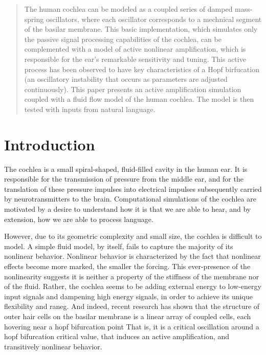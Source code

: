 \documentclass[12pt]{article}
\begin{document}
\maketitle

\begin{abstract}
The human cochlea can be modeled as a coupled series of damped mass-spring oscillators, where each oscillator corresponds to a mechnical segment of the basilar membrane. This basic implementation, which simulates only the passive signal processing capabilities of the cochlea, can be complemented with a model of active nonlinear amplification, which is responsible for the ear's remarkable sensitivity and tuning. This active process has been observed to have key characteristics of a Hopf birfucation (an oscillatory instability that occurs as parameters are adjusted continuously). This paper presents an active amplification simulation coupled with a fluid flow model of the human cochlea. The model is then tested with inputs from natural language. 
\end{abstract}
 

\section{Introduction}
The cochlea is a small spiral-shaped, fluid-filled cavity in the human ear. It is responsible for the transmission of pressure from the middle ear, and for the translation of these pressure impulses into electrical impulses subsequently carried by neurotransmitters to the brain. Computational simulations of the cochlea are motivated by a desire to understand how it is that we are able to hear, and by extension, how we are able to process language.
   
However, due to its geometric complexity and small size, the cochlea is difficult to model. A simple fluid model, by itself, fails to capture the majority of its nonlinear behavior. Nonlinear behavior is characterized by the fact that nonlinear effects become more marked, the smaller the forcing. This ever-presence of the nonlinearity suggests it is neither a property of the stiffness of the membrane nor of the fluid. Rather, the cochlea seems to be adding external energy to low-energy input signals and dampening high energy signals, in order to achieve its unique flexibility and raneg. And indeed, recent research has shown that the structure of outer hair cells on the basilar membrane is a linear array of coupled cells, each hovering near a hopf bifurcation point That is, it is a critical oscillation around a hopf bifurcation critical value, that induces an active amplification, and transitively nonlinear behavior.
\end{document}
